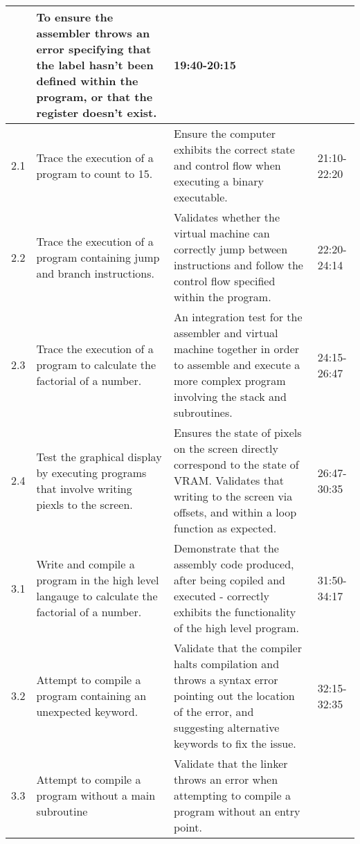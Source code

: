 \begin{longtable}{|p{1cm}|p{5cm}|p{5cm}|p{2cm}|}
        &
        To ensure the assembler throws an error specifying that the label hasn't been defined within the program, or that the register doesn't exist. 
        & 
        19:40-20:15
        \\
    \hline
        2.1
        & 
        Trace the execution of a program to count to 15.
        &
        Ensure the computer exhibits the correct state and control flow when executing a binary executable. 
        & 
        21:10-22:20
        \\
    \hline
        2.2
        & 
        Trace the execution of a program containing jump and branch instructions.
        &
        Validates whether the virtual machine can correctly jump between instructions and follow the control flow specified within the program.
        & 
        22:20-24:14
        \\
    \hline
        2.3
        & 
        Trace the execution of a program to calculate the factorial of a number.
        &
        An integration test for the assembler and virtual machine together in order to assemble and execute a more complex program involving the stack and subroutines. 
        & 
        24:15-26:47
        \\
    \hline
        2.4
        & 
        Test the graphical display by executing programs that involve writing piexls to the screen.
        &
        Ensures the state of pixels on the screen directly correspond to the state of VRAM. Validates that writing to the screen via offsets, and within a loop function as expected.
        & 
        26:47-30:35
        \\
    \hline
        3.1
        & 
        Write and compile a program in the high level langauge to calculate the factorial of a number.
        & 
        Demonstrate that the assembly code produced, after being copiled and executed - correctly exhibits the functionality of the high level program.
        & 
        31:50-34:17
        \\
    \hline
        3.2
        & 
        Attempt to compile a program containing an unexpected keyword.
        &
        Validate that the compiler halts compilation and throws a syntax error pointing out the location of the error, and suggesting alternative keywords to fix the issue. 
        & 
        32:15-32:35
        \\
    \hline
        3.3
        & 
        Attempt to compile a program without a main subroutine
        &
        Validate that the linker throws an error when attempting to compile a program without an entry point. 

\end{longtable}
